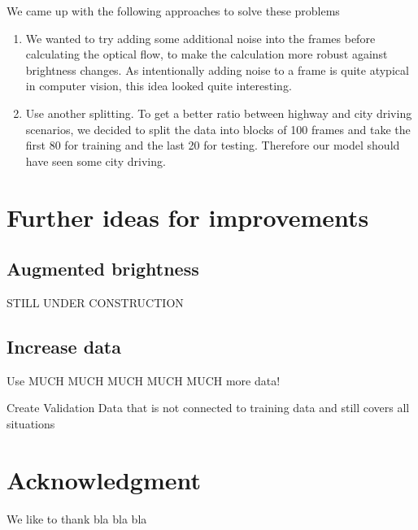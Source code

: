 \documentclass[conference]{IEEEtran}
\begin{document}
We came up with the following approaches to solve these problems
\begin{enumerate}[label=(\roman*)]
	\item We wanted to try adding some additional noise into the frames before calculating the optical flow, to make the calculation
	more robust against brightness changes. As intentionally adding 
	noise to a frame is quite atypical in computer vision, this idea looked quite interesting.
	\item Use another splitting. To get a better ratio between highway and city driving scenarios, we decided to split the data into
	blocks of 100 frames and take the first 80 for training and the last 20 for testing. Therefore our model should have seen some city
	driving.
\end{enumerate}




\section{Further ideas for improvements}

\subsection{Augmented brightness}
STILL UNDER CONSTRUCTION

\subsection{Increase data}

Use MUCH MUCH MUCH MUCH MUCH more data!

Create Validation Data that is not connected to training data and still covers all situations


\section*{Acknowledgment}
We like to thank bla bla bla




\printbibliography
\end{document}
